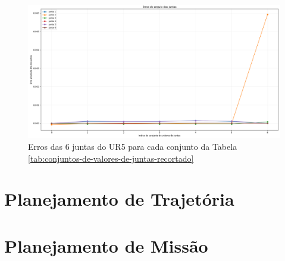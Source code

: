 \begin{figure}[htp]
	\centering
	\caption{Erros das 6 juntas do UR5 para cada conjunto da Tabela \ref{tab:conjuntos-de-valores-de-juntas-recortado}}
	\label{fig:grafico-erro-juntas-set-2}
	\includegraphics[width=\textwidth]{images/erro_do_angulo_das_juntas_set_2.png}
\end{figure}


\section{Planejamento de Trajetória}

\section{Planejamento de Missão}


